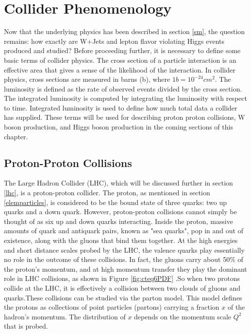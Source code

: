 \documentclass[oneside, letterpaper, oldfontcommands]{memoir}
\begin{document}
\chapter{Collider Phenomenology}\label{pheno}
Now that the underlying physics has been described in section \ref{sm}, the question remains: how exactly are W+Jets and lepton flavor violating Higgs events produced and studied? Before proceeding further, it is necessary to define some basic terms of collider physics. The cross section of a particle interaction is an effective area that gives a sense of the likelihood of the interaction. In collider physics, cross sections are measured in barns (b), where $1b = 10^{-24}cm^{2}$. The luminosity is defined as the rate of observed events divided by the cross section. The integrated luminosity is computed by integrating the luminosity with respect to time. Integrated luminosity is used to define how much total data a collider has supplied. These terms will be used for describing proton proton collisions, W boson production, and Higgs boson production in the coming sections of this chapter.

\section{Proton-Proton Collisions}\label{ppcoll}
\qquad The Large Hadron Collider (LHC), which will be discussed further in section \ref{lhc}, is a proton-proton collider. The proton, as mentioned in section \ref{elemparticles}, is considered to be the bound state of three quarks: two up quarks and a down quark. However, proton-proton collisions cannot simply be thought of as six up and down quarks interacting. Inside the proton, massive amounts of quark and antiquark pairs, known as "sea quarks", pop in and out of existence, along with the gluons that bind them together. At the high energies and short distance scales probed by the LHC, the valence quarks play essentially no role in the outcome of these collisions. In fact, the gluons carry about 50$\%$ of the proton's momentum\cite{Halzen:1984mc}, and at high momentum transfer they play the dominant role in LHC collisions, as shown in Figure \ref{fig:cteq6PDF} .So when two protons collide at the LHC, it is effectively a collision between two clouds of gluons and quarks.These collisions can be studied via the parton model. This model defines the protons as collections of point particles (partons) carrying a fraction $x$ of the hadron's momentum. The distribution of $x$ depends on the momentum scale $Q^{2}$ that is probed. 
\end{document}
